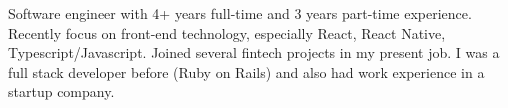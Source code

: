 

\begin{cvparagraph}

Software engineer with 4+ years full-time and 3 years part-time experience. Recently focus on front-end technology, especially React, React Native, Typescript/Javascript. Joined several fintech projects in my present job. I was a full stack developer before (Ruby on Rails) and also had work experience in a startup company. 
\end{cvparagraph}
